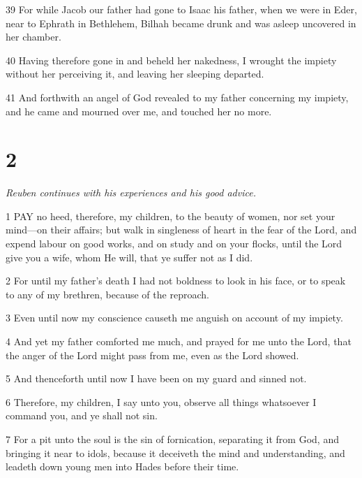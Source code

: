 \par 39 For while Jacob our father had gone to Isaac his father, when we were in Eder, near to Ephrath in Bethlehem, Bilhah became drunk and was asleep uncovered in her chamber.

\par 40 Having therefore gone in and beheld her nakedness, I wrought the impiety without her perceiving it, and leaving her sleeping departed.

\par 41 And forthwith an angel of God revealed to my father concerning my impiety, and he came and mourned over me, and touched her no more.

\chapter{2}

\par \textit{Reuben continues with his experiences and his good advice.}

\par 1 PAY no heed, therefore, my children, to the beauty of women, nor set your mind—on their affairs; but walk in singleness of heart in the fear of the Lord, and expend labour on good works, and on study and on your flocks, until the Lord give you a wife, whom He will, that ye suffer not as I did.

\par 2 For until my father's death I had not boldness to look in his face, or to speak to any of my brethren, because of the reproach.

\par 3 Even until now my conscience causeth me anguish on account of my impiety.

\par 4 And yet my father comforted me much, and prayed for me unto the Lord, that the anger of the Lord might pass from me, even as the Lord showed.

\par 5 And thenceforth until now I have been on my guard and sinned not.

\par 6 Therefore, my children, I say unto you, observe all things whatsoever I command you, and ye shall not sin.

\par 7 For a pit unto the soul is the sin of fornication, separating it from God, and bringing it near to idols, because it deceiveth the mind and understanding, and leadeth down young men into Hades before their time.

